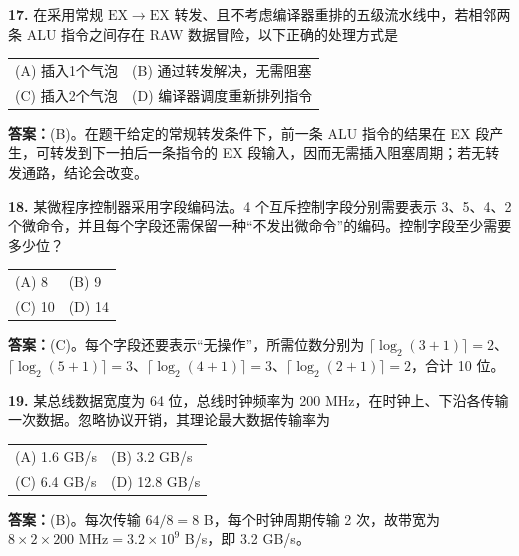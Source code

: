 \noindent\textbf{17.} 在采用常规 $\mathrm{EX}\!\to\!\mathrm{EX}$ 转发、且不考虑编译器重排的五级流水线中，若相邻两条 ALU 指令之间存在 RAW 数据冒险，以下正确的处理方式是
\begin{center}
\begin{tabular}{ll}
(A) 插入1个气泡 & (B) 通过转发解决，无需阻塞 \\[6pt]
(C) 插入2个气泡 & (D) 编译器调度重新排列指令
\end{tabular}
\end{center}

\ifshowsolutions\par\noindent\textbf{答案：}(B)。在题干给定的常规转发条件下，前一条 ALU 指令的结果在 EX 段产生，可转发到下一拍后一条指令的 EX 段输入，因而无需插入阻塞周期；若无转发通路，结论会改变。\else \answerarea \fi

\vspace{6pt}

\noindent\textbf{18.} 某微程序控制器采用字段编码法。4 个互斥控制字段分别需要表示 3、5、4、2 个微命令，并且每个字段还需保留一种“不发出微命令”的编码。控制字段至少需要多少位？
\begin{center}
\begin{tabular}{ll}
(A) 8 & (B) 9 \\[6pt]
(C) 10 & (D) 14
\end{tabular}
\end{center}

\ifshowsolutions\par\noindent\textbf{答案：}(C)。每个字段还要表示“无操作”，所需位数分别为
$\lceil\log_2(3+1)\rceil=2$、$\lceil\log_2(5+1)\rceil=3$、$\lceil\log_2(4+1)\rceil=3$、$\lceil\log_2(2+1)\rceil=2$，合计 10 位。\else \answerarea \fi

\vspace{6pt}

\noindent\textbf{19.} 某总线数据宽度为 64 位，总线时钟频率为 200 MHz，在时钟上、下沿各传输一次数据。忽略协议开销，其理论最大数据传输率为
\begin{center}
\begin{tabular}{ll}
(A) 1.6 GB/s & (B) 3.2 GB/s \\[6pt]
(C) 6.4 GB/s & (D) 12.8 GB/s
\end{tabular}
\end{center}

\ifshowsolutions\par\noindent\textbf{答案：}(B)。每次传输 $64/8=8$ B，每个时钟周期传输 2 次，故带宽为 $8\times2\times200\text{ MHz}=3.2\times10^9$ B/s，即 3.2 GB/s。\else \answerarea \fi


